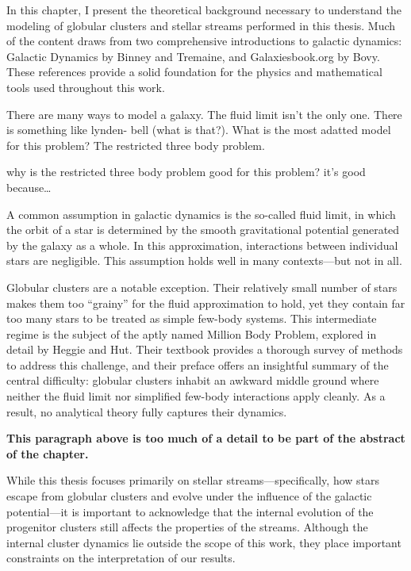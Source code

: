 In this chapter, I present the theoretical background necessary to understand the modeling of globular clusters and stellar streams performed in this thesis. Much of the content draws from two comprehensive introductions to galactic dynamics: Galactic Dynamics by Binney and Tremaine, and Galaxiesbook.org by Bovy. These references provide a solid foundation for the physics and mathematical tools used throughout this work.



    There are many ways to model a galaxy. The fluid limit isn't the only one. There is something like lynden- bell (what is that?). What is the most adatted model for this problem? The restricted three body problem. 

    why is the restricted three body problem good for this problem? it's good because\dots 

    


A common assumption in galactic dynamics is the so-called fluid limit, in which the orbit of a star is determined by the smooth gravitational potential generated by the galaxy as a whole. In this approximation, interactions between individual stars are negligible. This assumption holds well in many contexts—but not in all.

Globular clusters are a notable exception. Their relatively small number of stars makes them too “grainy” for the fluid approximation to hold, yet they contain far too many stars to be treated as simple few-body systems. This intermediate regime is the subject of the aptly named Million Body Problem, explored in detail by Heggie and Hut. Their textbook provides a thorough survey of methods to address this challenge, and their preface offers an insightful summary of the central difficulty: globular clusters inhabit an awkward middle ground where neither the fluid limit nor simplified few-body interactions apply cleanly. As a result, no analytical theory fully captures their dynamics.

\textbf{This paragraph above is too much of a detail to be part of the abstract of the chapter.}

While this thesis focuses primarily on stellar streams—specifically, how stars escape from globular clusters and evolve under the influence of the galactic potential—it is important to acknowledge that the internal evolution of the progenitor clusters still affects the properties of the streams. Although the internal cluster dynamics lie outside the scope of this work, they place important constraints on the interpretation of our results.



